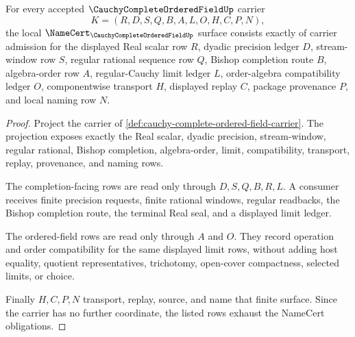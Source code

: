 \begin{theorem}
\label{thm:cauchy-complete-ordered-field-namecert-obligations}
For every accepted $\CauchyCompleteOrderedFieldUp$ carrier
$$
K=(R,D,S,Q,B,A,L,O,H,C,P,N),
$$
the local $\NameCert_{\CauchyCompleteOrderedFieldUp}$ surface consists exactly of carrier admission for the displayed Real scalar row $R$, dyadic precision ledger $D$, stream-window row $S$, regular rational sequence row $Q$, Bishop completion route $B$, algebra-order row $A$, regular-Cauchy limit ledger $L$, order-algebra compatibility ledger $O$, componentwise transport $H$, displayed replay $C$, package provenance $P$, and local naming row $N$.
\end{theorem}
\begin{proof}
Project the carrier of \autoref{def:cauchy-complete-ordered-field-carrier}. The projection exposes exactly the Real scalar, dyadic precision, stream-window, regular rational, Bishop completion, algebra-order, limit, compatibility, transport, replay, provenance, and naming rows.

The completion-facing rows are read only through $D,S,Q,B,R,L$. A consumer receives finite precision requests, finite rational windows, regular readbacks, the Bishop completion route, the terminal Real seal, and a displayed limit ledger.

The ordered-field rows are read only through $A$ and $O$. They record operation and order compatibility for the same displayed limit rows, without adding host equality, quotient representatives, trichotomy, open-cover compactness, selected limits, or choice.

Finally $H,C,P,N$ transport, replay, source, and name that finite surface. Since the carrier has no further coordinate, the listed rows exhaust the NameCert obligations.
\end{proof}

